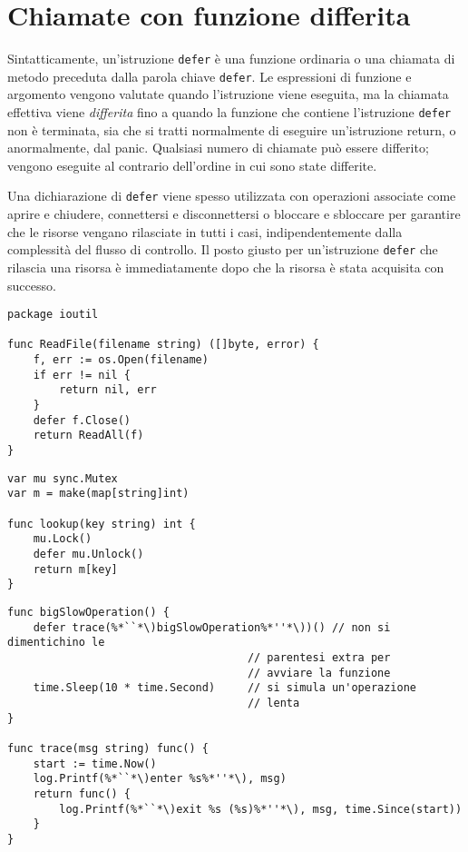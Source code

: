 \section{Chiamate con funzione differita}
\label{sec:chiamate_con_funzione_differita}%
Sintatticamente, un'istruzione \verb|defer| è una funzione ordinaria o una chiamata di metodo preceduta dalla parola chiave \verb|defer|.
Le espressioni di funzione e argomento vengono valutate quando l'istruzione viene eseguita, ma la chiamata effettiva viene \textit{differita} fino a quando la funzione che contiene l'istruzione \verb|defer| non è terminata, sia che si tratti normalmente di eseguire un'istruzione return, o anormalmente, dal panic.
Qualsiasi numero di chiamate può essere differito;
vengono eseguite al contrario dell'ordine in cui sono state differite.

Una dichiarazione di \verb|defer| viene spesso utilizzata con operazioni associate come aprire e chiudere, connettersi e disconnettersi o bloccare e sbloccare per garantire che le risorse vengano rilasciate in tutti i casi, indipendentemente dalla complessità del flusso di controllo.
Il posto giusto per un'istruzione \verb|defer| che rilascia una risorsa è immediatamente dopo che la risorsa è stata acquisita con successo.
\begin{lstlisting}[frame=single, label={lst:lstlisting4-8.1}]
package ioutil

func ReadFile(filename string) ([]byte, error) {
    f, err := os.Open(filename)
    if err != nil {
        return nil, err
    }
    defer f.Close()
    return ReadAll(f)
}
\end{lstlisting}
\begin{lstlisting}[frame=single, label={lst:lstlisting4-8.2}]
var mu sync.Mutex
var m = make(map[string]int)

func lookup(key string) int {
    mu.Lock()
    defer mu.Unlock()
    return m[key]
}
\end{lstlisting}
\begin{lstlisting}[frame=single, label={lst:lstlisting4-8.3}]
func bigSlowOperation() {
    defer trace(%*``*\)bigSlowOperation%*''*\))() // non si dimentichino le
                                     // parentesi extra per
                                     // avviare la funzione
    time.Sleep(10 * time.Second)     // si simula un'operazione
                                     // lenta
}

func trace(msg string) func() {
    start := time.Now()
    log.Printf(%*``*\)enter %s%*''*\), msg)
    return func() {
        log.Printf(%*``*\)exit %s (%s)%*''*\), msg, time.Since(start))
    }
}
\end{lstlisting}
